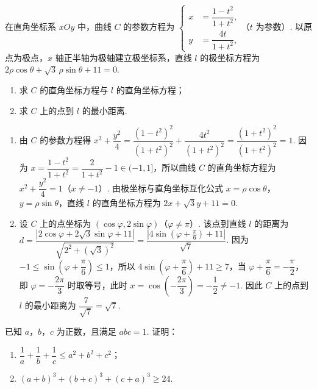 \begin{problem}
在直角坐标系 \(xOy\) 中，曲线 \(C\) 的参数方程为 \(\left\{\begin{aligned}x&=\dfrac{1-t^2}{1+t^2},\\y&=\dfrac{4t}{1+t^2},\end{aligned}\right.\)（\(t\) 为参数）. 以原点为极点，\(x\) 轴正半轴为极轴建立极坐标系，直线 \(l\) 的极坐标方程为 \(2\rho\cos\theta+\sqrt3\,\rho\sin\theta+11=0\).

\begin{enumerate}
\item 求 \(C\) 的直角坐标方程与 \(l\) 的直角坐标方程；

\item 求 \(C\) 上的点到 \(l\) 的最小距离.
\end{enumerate}
\end{problem}

\begin{solution}
\begin{enumerate}
\item 由 \(C\) 的参数方程得 \(x^2+\dfrac{y^2}{4}=\dfrac{(1-t^2)^2}{(1+t^2)^2}+\dfrac{4t^2}{(1+t^2)^2}=\dfrac{(1+t^2)^2}{(1+t^2)^2}=1\). 因为 \(x=\dfrac{1-t^2}{1+t^2}=\dfrac{2}{1+t^2}-1\in(-1,1]\)，所以曲线 \(C\) 的直角坐标方程为 \(x^2+\dfrac{y^2}{4}=1\)（\(x\ne-1\)）. 由极坐标与直角坐标互化公式 \(x=\rho\cos\theta\)，\(y=\rho\sin\theta\)，直线 \(l\) 的直角坐标方程为 \(2x+\sqrt3y+11=0\).
\item 设 \(C\) 上的点坐标为 \((\cos\varphi,2\sin\varphi)\)（\(\varphi\ne\pi\)）. 该点到直线 \(l\) 的距离为 \(d=\dfrac{|2\cos\varphi+2\sqrt3\sin\varphi+11|}{\sqrt{2^2+(\sqrt3)^2}}=\dfrac{|4\sin\left(\varphi+\frac\pi6\right)+11|}{\sqrt7}\). 因为 \(-1\le\sin\left(\varphi+\dfrac\pi6\right)\le1\)，所以 \(4\sin\left(\varphi+\dfrac\pi6\right)+11\ge7\)，当 \(\varphi+\dfrac\pi6=-\dfrac\pi2\)，即 \(\varphi=-\dfrac{2\pi}{3}\) 时取等号，此时 \(x=\cos\left(-\dfrac{2\pi}{3}\right)=-\dfrac12\ne-1\). 因此 \(C\) 上的点到 \(l\) 的最小距离为 \(\dfrac{7}{\sqrt7}=\sqrt7\).
\end{enumerate}
\end{solution}

\begin{problem}
已知 \(a\)，\(b\)，\(c\) 为正数，且满足 \(abc=1\). 证明：

\begin{enumerate}
\item \(\dfrac{1}{a}+\dfrac{1}{b}+\dfrac{1}{c}\le a^2+b^2+c^2\)；

\item \((a+b)^3+(b+c)^3+(c+a)^3\ge24\).
\end{enumerate}
\end{problem}

